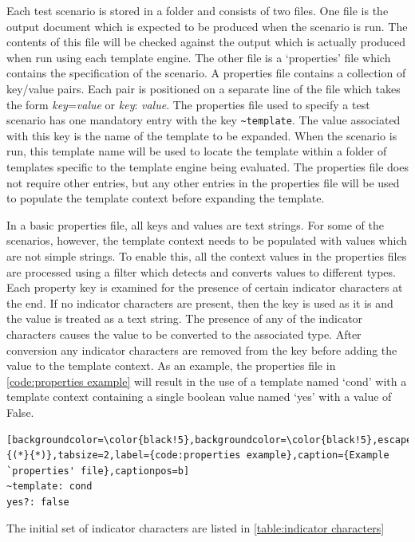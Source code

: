 Each test scenario is stored in a folder and consists of two files. One file is the output document which is expected to be produced when the scenario is run. The contents of this file will be checked against the output which is actually produced when run using each template engine. The other file is a `properties' file which contains the specification of the scenario. A properties file contains a collection of key/value pairs. Each pair is positioned on a separate line of the file which takes the form \emph{key}=\emph{value} or \emph{key}: \emph{value}. The properties file used to specify a test scenario has one mandatory entry with the key \verb!~template!. The value associated with this key is the name of the template to be expanded. When the scenario is run, this template name will be used to locate the template within a folder of templates specific to the template engine being evaluated. The properties file does not require other entries, but any other entries in the properties file will be used to populate the template context before expanding the template.

In a basic properties file, all keys and values are text strings. For some of the scenarios, however, the template context needs to be populated with values which are not simple strings. To enable this, all the context values in the properties files are processed using a filter which detects and converts values to different types. Each property key is examined for the presence of certain indicator characters at the end. If no indicator characters are present, then the key is used as it is and the value is treated as a text string. The presence of any of the indicator characters causes the value to be converted to the associated type. After conversion any indicator characters are removed from the key before adding the value to the template context. As an example, the properties file in \autoref{code:properties example} will result in the use of a template named `cond' with a template context containing a single boolean value named `yes' with a value of False.

\begin{lstlisting}[backgroundcolor=\color{black!5},backgroundcolor=\color{black!5},escapeinside={(*}{*)},tabsize=2,label={code:properties example},caption={Example `properties' file},captionpos=b]
~template: cond
yes?: false
\end{lstlisting}

The initial set of indicator characters are listed in \autoref{table:indicator characters}

